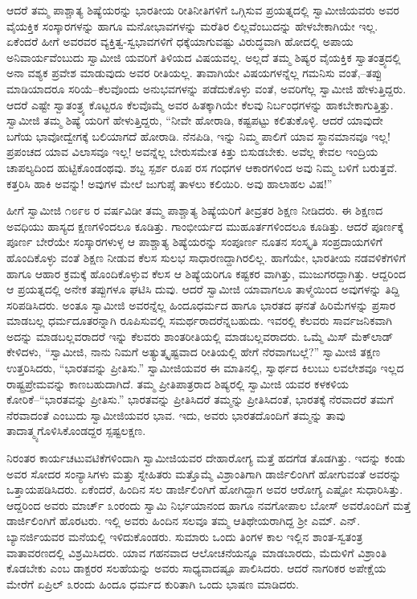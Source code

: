 ಆದರೆ ತಮ್ಮ ಪಾಶ್ಚಾತ್ಯ ಶಿಷ್ಯೆಯರನ್ನು ಭಾರತೀಯ ರೀತಿನೀತಿಗಳಿಗೆ ಒಗ್ಗಿಸುವ ಪ್ರಯತ್ನದಲ್ಲಿ ಸ್ವಾಮೀಜಿಯವರು ಅವರ ವೈಯಕ್ತಿಕ ಸಂಸ್ಕಾರಗಳನ್ನು ಹಾಗೂ ಮನೋಭಾವಗಳನ್ನು ಮರೆತಿರ ಲಿಲ್ಲವೆಂಬುದನ್ನು ಹೇಳಬೇಕಾಗಿಯೇ ಇಲ್ಲ. ಏಕೆಂದರೆ ಹೀಗೆ ಅವರವರ ವ್ಯಕ್ತಿತ್ವ-ಸ್ವಭಾವಗಳಿಗೆ ಧಕ್ಕೆಯಾಗುವಷ್ಟು ವಿರುದ್ಧವಾಗಿ ಹೋದಲ್ಲಿ ಅಪಾಯ ಅನಿವಾರ್ಯವೆಂಬುದು ಸ್ವಾಮೀಜಿ ಯವರಿಗೆ ತಿಳಿಯದ ವಿಷಯವಲ್ಲ. ಅಲ್ಲದೆ ತಮ್ಮ ಶಿಷ್ಯರ ವೈಯಕ್ತಿಕ ಸ್ವಾತಂತ್ರ್ಯದಲ್ಲಿ ಅನಾ ವಶ್ಯಕ ಪ್ರವೇಶ ಮಾಡುವುದು ಅವರ ರೀತಿಯಲ್ಲ. ತಾವಾಗಿಯೇ ವಿಷಯಗಳನ್ನೆಲ್ಲ ಗಮನಿಸು ವಂತೆ,–ತಪ್ಪು ಮಾಡಿಯಾದರೂ ಸರಿಯೆ–ಕೆಲವೊಂದು ಅನುಭವಗಳನ್ನು ಪಡೆದುಕೊಳ್ಳು ವಂತೆ, ಅವರಿಗೆಲ್ಲ ಸ್ವಾಮೀಜಿ ಹೇಳುತ್ತಿದ್ದರು. ಆದರೆ ಎಷ್ಟೇ ಸ್ವಾತಂತ್ರ್ಯ ಕೊಟ್ಟರೂ ಕೆಲವೊಮ್ಮೆ ಅವರ ಹಿತಕ್ಕಾಗಿಯೇ ಕೆಲವು ನಿರ್ಬಂಧಗಳನ್ನು ಹಾಕಬೇಕಾಗುತ್ತಿತ್ತು. ಸ್ವಾಮೀಜಿ ತಮ್ಮ ಶಿಷ್ಯೆ ಯರಿಗೆ ಹೇಳುತ್ತಿದ್ದರು, “ನೀವೇ ಹೋರಾಡಿ, ಕಷ್ಟಪಟ್ಟು ಕಲಿತುಕೊಳ್ಳಿ. ಆದರೆ ಯಾವುದೇ ಬಗೆಯ ಭಾವೋದ್ವೇಗಕ್ಕೆ ಬಲಿಯಾಗದೆ ಹೋರಾಡಿ. ನೆನಪಿಡಿ, ಇನ್ನು ನಿಮ್ಮ ಪಾಲಿಗೆ ಯಾವ ಸ್ಥಾನಮಾನವೂ ಇಲ್ಲ! ಪ್ರಪಂಚದ ಯಾವ ವಿಲಾಸವೂ ಇಲ್ಲ! ಅವನ್ನೆಲ್ಲ ಬೇರುಸಮೇತ ಕಿತ್ತು ಬಿಸುಡಬೇಕು. ಅವೆಲ್ಲ ಕೇವಲ ಇಂದ್ರಿಯ ಚಾಪಲ್ಯದಿಂದ ಹುಟ್ಟಿಕೊಂಡಂಥವು. ಶಬ್ದ ಸ್ಪರ್ಶ ರೂಪ ರಸ ಗಂಧಗಳ ಆಕಾರಗಳಿಂದ ಅವು ನಿಮ್ಮ ಬಳಿಗೆ ಬರುತ್ತವೆ. ಕತ್ತರಿಸಿ ಹಾಕಿ ಅವನ್ನು! ಅವುಗಳ ಮೇಲೆ ಜುಗುಪ್ಸೆ ತಾಳಲು ಕಲಿಯಿರಿ. ಅವು ಹಾಲಾಹಲ ವಿಷ!”

ಹೀಗೆ ಸ್ವಾಮೀಜಿ ೧೮೯೮ ರ ವರ್ಷವಿಡೀ ತಮ್ಮ ಪಾಶ್ಚಾತ್ಯ ಶಿಷ್ಯೆಯರಿಗೆ ತೀವ್ರತರ ಶಿಕ್ಷಣ ನೀಡಿದರು. ಈ ಶಿಕ್ಷಣದ ಅವಧಿಯು ಹಾಸ್ಯದ ಕ್ಷಣಗಳಿಂದಲೂ ಕೂಡಿತ್ತು. ಗಾಂಭೀರ್ಯದ ಮುಹೂರ್ತಗಳಿಂದಲೂ ಕೂಡಿತ್ತು. ಆದರೆ ಪೂರ್ಣಕ್ಕೆ ಪೂರ್ಣ ಬೇರೆಯೇ ಸಂಸ್ಕಾರಗಳುಳ್ಳ ಆ ಪಾಶ್ಚಾತ್ಯ ಶಿಷ್ಯೆಯರನ್ನು ಸಂಪೂರ್ಣ ನೂತನ ಸಂಸ್ಕೃತಿ ಸಂಪ್ರದಾಯಗಳಿಗೆ ಹೊಂದಿಕೊಳ್ಳು ವಂತೆ ಶಿಕ್ಷಣ ನೀಡುವ ಕೆಲಸ ಸುಲಭ ಸಾಧಾರಣದ್ದಾಗಿರಲಿಲ್ಲ. ಹಾಗೆಯೇ, ಭಾರತೀಯ ನಡವಳಿಕೆಗಳಿಗೆ ಹಾಗೂ ಆಹಾರ ಕ್ರಮಕ್ಕೆ ಹೊಂದಿಕೊಳ್ಳುವ ಕೆಲಸ ಆ ಶಿಷ್ಯೆಯರಿಗೂ ಕಷ್ಟಕರ ವಾಗಿತ್ತು, ಮುಜುಗರದ್ದಾಗಿತ್ತು. ಆದ್ದರಿಂದ ಆ ಪ್ರಯತ್ನದಲ್ಲಿ ಅನೇಕ ತಪ್ಪುಗಳೂ ಘಟಿಸಿ ದುವು. ಆದರೆ ಸ್ವಾಮೀಜಿ ಯಾವಾಗಲೂ ತಾಳ್ಮೆಯಿಂದ ಅವುಗಳನ್ನು ತಿದ್ದಿ ಸರಿಪಡಿಸಿದರು. ಅಂತೂ ಸ್ವಾಮೀಜಿ ಅವರನ್ನೆಲ್ಲ ಹಿಂದೂಧರ್ಮದ ಹಾಗೂ ಭಾರತದ ಘನತೆ ಹಿರಿಮೆಗಳನ್ನು ಪ್ರಸಾರ ಮಾಡಬಲ್ಲ ಧರ್ಮದೂತರನ್ನಾಗಿ ರೂಪಿಸುವಲ್ಲಿ ಸಮರ್ಥರಾದರೆನ್ನಬಹುದು. ಇವರಲ್ಲಿ ಕೆಲವರು ಸಾರ್ವಜನಿಕವಾಗಿ ಅದನ್ನು ಮಾಡಬಲ್ಲವರಾದರೆ ಇನ್ನು ಕೆಲವರು ಶಾಂತರೀತಿಯಲ್ಲಿ ಮಾಡಬಲ್ಲವರಾದರು. ಒಮ್ಮೆ ಮಿಸ್ ಮೆಕ್​ಲಾಡ್ ಕೇಳಿದಳು, “ಸ್ವಾಮೀಜಿ, ನಾನು ನಿಮಗೆ ಅತ್ಯುತ್ಕೃಷ್ಟವಾದ ರೀತಿಯಲ್ಲಿ ಹೇಗೆ ನೆರವಾಗಬಲ್ಲೆ?” ಸ್ವಾಮೀಜಿ ತಕ್ಷಣ ಉತ್ತರಿಸಿದರು, “ಭಾರತವನ್ನು ಪ್ರೀತಿಸು.” ಸ್ವಾಮೀಜಿಯವರ ಈ ಮಾತಿನಲ್ಲಿ, ಸ್ವಾರ್ಥದ ಕಿಲುಬು ಲವಲೇಶವೂ ಇಲ್ಲದ ರಾಷ್ಟ್ರಪ್ರೇಮವನ್ನು ಕಾಣಬಹುದಾಗಿದೆ. ತಮ್ಮ ಪ್ರೀತಿಪಾತ್ರರಾದ ಶಿಷ್ಯರಲ್ಲಿ ಸ್ವಾಮೀಜಿ ಯವರ ಕಳಕಳಿಯ ಕೋರಿಕೆ–“ಭಾರತವನ್ನು ಪ್ರೀತಿಸು.” ಭಾರತವನ್ನು ಪ್ರೀತಿಸಿದರೆ ತಮ್ಮನ್ನು ಪ್ರೀತಿಸಿದಂತೆ, ಭಾರತಕ್ಕೆ ನೆರವಾದರೆ ತಮಗೆ ನೆರವಾದಂತೆ ಎಂಬುದು ಸ್ವಾಮೀಜಿಯವರ ಭಾವ. ಇದು, ಅವರು ಭಾರತದೊಂದಿಗೆ ತಮ್ಮನ್ನು ತಾವು ತಾದಾತ್ಮ್ಯಗೊಳಿಸಿಕೊಂಡದ್ದರ ಸ್ಪಷ್ಟಲಕ್ಷಣ.

ನಿರಂತರ ಕಾರ್ಯಚಟುವಟಿಕೆಗಳಿಂದಾಗಿ ಸ್ವಾಮೀಜಿಯವರ ದೇಹಾರೋಗ್ಯ ಮತ್ತೆ ಹದಗೆಡ ತೊಡಗಿತ್ತು. ಇದನ್ನು ಕಂಡು ಅವರ ಸೋದರ ಸಂನ್ಯಾಸಿಗಳು ಮತ್ತು ಸ್ನೇಹಿತರು ಮತ್ತೊಮ್ಮೆ ವಿಶ್ರಾಂತಿಗಾಗಿ ಡಾರ್ಜಿಲಿಂಗಿಗೆ ಹೋಗುವಂತೆ ಅವರನ್ನು ಒತ್ತಾಯಪಡಿಸಿದರು. ಏಕೆಂದರೆ, ಹಿಂದಿನ ಸಲ ಡಾರ್ಜಿಲಿಂಗಿಗೆ ಹೋಗಿದ್ದಾಗ ಅವರ ಆರೋಗ್ಯ ಎಷ್ಟೋ ಸುಧಾರಿಸಿತ್ತು. ಆದ್ದರಿಂದ ಅವರು ಮಾರ್ಚ್ ೩ಂರಂದು ಸ್ವಾಮಿ ನಿರ್ಭಯಾನಂದ ಹಾಗೂ ನವಗೋಪಾಲ ಬೋಸ್ ಅವರೊಂದಿಗೆ ಮತ್ತೆ ಡಾರ್ಜಿಲಿಂಗಿಗೆ ಹೊರಟರು. ಇಲ್ಲಿ ಅವರು ಹಿಂದಿನ ಸಲವೂ ತಮ್ಮ ಆತಿಥೇಯರಾಗಿದ್ದ ಶ್ರೀ ಎಮ್. ಎನ್. ಬ್ಯಾನರ್ಜಿಯವರ ಮನೆಯಲ್ಲಿ ಇಳಿದುಕೊಂಡರು. ಸುಮಾರು ಒಂದು ತಿಂಗಳ ಕಾಲ ಇಲ್ಲಿನ ಶಾಂತ-ಸ್ವತಂತ್ರ ವಾತಾವರಣದಲ್ಲಿ ವಿಶ್ರಮಿಸಿದರು. ಯಾವ ಗಹನವಾದ ಆಲೋಚನೆಯನ್ನೂ ಮಾಡಬಾರದು, ಮೆದುಳಿಗೆ ವಿಶ್ರಾಂತಿ ಕೊಡಬೇಕು ಎಂಬ ಡಾಕ್ಟರರ ಸಲಹೆಯನ್ನು ಅವರು ಸಾಧ್ಯವಾದಷ್ಟೂ ಪಾಲಿಸಿದರು. ಆದರೆ ನಾಗರಿಕರ ಅಪೇಕ್ಷೆಯ ಮೇರೆಗೆ ಏಪ್ರಿಲ್ ೩ರಂದು ಹಿಂದೂ ಧರ್ಮದ ಕುರಿತಾಗಿ ಒಂದು ಭಾಷಣ ಮಾಡಿದರು.


